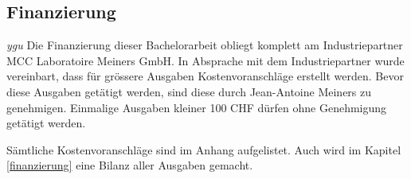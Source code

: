 \subsection{Finanzierung}
\textit{ygu} Die Finanzierung dieser Bachelorarbeit obliegt komplett am Industriepartner MCC Laboratoire Meiners GmbH. In Absprache mit dem Industriepartner wurde vereinbart, dass für grössere Ausgaben Kostenvoranschläge erstellt werden. Bevor diese Ausgaben getätigt werden, sind diese durch Jean-Antoine Meiners zu genehmigen. Einmalige Ausgaben kleiner 100 CHF dürfen ohne Genehmigung getätigt werden.
\newline

Sämtliche Kostenvoranschläge sind im Anhang aufgelistet. Auch wird im Kapitel \ref{finanzierung} eine Bilanz aller Ausgaben gemacht. 